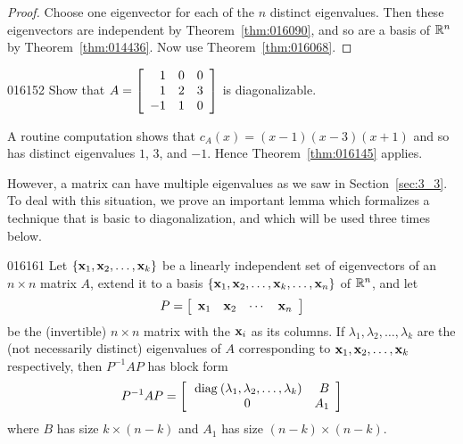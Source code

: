 \begin{proof}
Choose one eigenvector for each of the $n$ distinct eigenvalues. Then these eigenvectors are independent by Theorem~\ref{thm:016090}, and so are a basis of $\mathbb{R}^n$ by Theorem~\ref{thm:014436}. Now use Theorem~\ref{thm:016068}.
\end{proof}

\begin{example}{}{016152}
Show that $A = 
\left[ \begin{array}{rrr}
1 & 0 & 0 \\
1 & 2 & 3 \\
-1 & 1 & 0 \\
\end{array} \right]$ is diagonalizable.

\begin{solution}
A routine computation shows that $c_{A}(x) = (x - 1)(x - 3)(x + 1)$ and so has distinct eigenvalues $1$, $3$, and $-1$. Hence Theorem~\ref{thm:016145} applies.
\end{solution}
\end{example}

However, a matrix can have multiple eigenvalues as we saw in Section~\ref{sec:3_3}. To deal with this situation, we prove an important lemma which formalizes a technique that is basic to diagonalization, and which will be used three times below.

\newpage
\begin{lemma}{}{016161}
Let $\{\textbf{x}_{1}, \textbf{x}_{2}, \dots, \textbf{x}_{k}\}$ be a linearly independent set of eigenvectors of an $n \times n$ matrix $A$, extend it to a basis $\{\textbf{x}_{1}, \textbf{x}_{2}, \dots, \textbf{x}_{k}, \dots, \textbf{x}_{n}\}$ of $\mathbb{R}^n$, and let
\begin{equation*}
P = 
\left[ \begin{array}{cccc}
\textbf{x}_1 & \textbf{x}_2 & \cdots  & \textbf{x}_n
\end{array} \right]
\end{equation*}
be the (invertible) $n \times n$ matrix with the $\textbf{x}_{i}$ as its columns. If $\lambda_{1}, \lambda_{2}, \dots, \lambda_{k}$ are the (not necessarily distinct) eigenvalues of $A$ corresponding to $\textbf{x}_{1}, \textbf{x}_{2}, \dots, \textbf{x}_{k}$ respectively, then $P^{-1}AP$ has block form
\begin{equation*}
P^{-1}AP = 
\left[ \begin{array}{cr}
\thinspace\operatorname{diag\medspace}(\lambda_1, \lambda_2, \dots, \lambda_k) & B \\
0 & A_1
\end{array} \right]
\end{equation*}
where $B$ has size $k \times (n - k)$ and $A_1$ has size $(n - k) \times (n - k)$.
\end{lemma}

